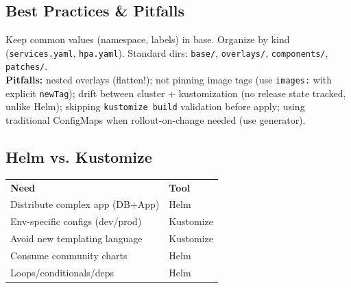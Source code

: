 \subsection{Best Practices \& Pitfalls}
Keep common values (namespace, labels) in base. Organize by kind (\texttt{services.yaml}, \texttt{hpa.yaml}). Standard dirs: \texttt{base/}, \texttt{overlays/}, \texttt{components/}, \texttt{patches/}.\\
\textbf{Pitfalls:} nested overlays (flatten!); not pinning image tags (use \texttt{images:} with explicit \texttt{newTag}); drift between cluster + kustomization (no release state tracked, unlike Helm); skipping \texttt{kustomize build} validation before apply; using traditional ConfigMaps when rollout-on-change needed (use generator).

\subsection{Helm vs. Kustomize}
\begin{tabular}{ll}
\textbf{Need} & \textbf{Tool} \\
Distribute complex app (DB+App) & Helm \\
Env-specific configs (dev/prod) & Kustomize \\
Avoid new templating language & Kustomize \\
Consume community charts & Helm \\
Loops/conditionals/deps & Helm \\
\end{tabular}
